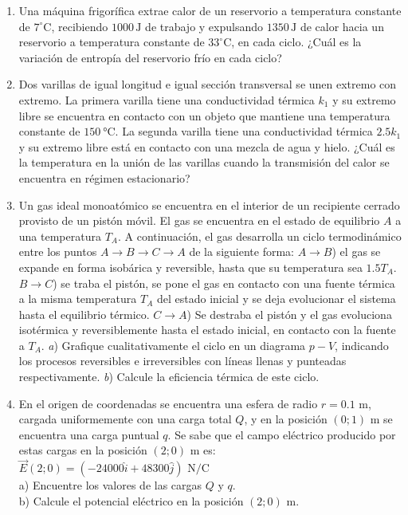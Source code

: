 \documentclass[a4paper,11pt,dvipsnames, twocolumn]{article}
\begin{document}
\begin{enumerate}[wide, labelwidth=2pt, labelindent=0pt]
  
  \item Una máquina frigorífica extrae calor de un reservorio a temperatura constante de $7^\circ\text{C}$, recibiendo $1000\,\text{J}$ de trabajo y expulsando $1350\,\text{J}$ de calor hacia un reservorio a temperatura constante de $33^\circ\text{C}$, en cada ciclo. ¿Cuál es la variación de entropía del reservorio frío en cada ciclo?
  
  
  \item Dos varillas de igual longitud e igual sección transversal se unen extremo con extremo. La primera varilla tiene una conductividad térmica $k_1$ y su extremo libre se encuentra en contacto con un objeto que mantiene una temperatura constante de $\SI{150}{\celsius}$. La segunda varilla tiene una conductividad térmica $2.5k_1$ y su extremo libre está en contacto con una mezcla de agua y hielo. ¿Cuál es la temperatura en la unión de las varillas cuando la transmisión del calor se encuentra en régimen estacionario?

\item Un gas ideal monoatómico se encuentra en el interior de un recipiente cerrado provisto de un pistón móvil. El gas se encuentra en el estado de equilibrio $A$ a una temperatura $T_A$. A continuación, el gas desarrolla un ciclo termodinámico entre los puntos $A\rightarrow B \rightarrow C \rightarrow A$ de la siguiente forma: $A\rightarrow B$) el gas se expande en forma isobárica y reversible, hasta que su temperatura sea $1.5T_A$. $B\rightarrow C$) se traba el pistón, se pone el gas en contacto con una fuente térmica a la misma temperatura $T_A$ del estado inicial y se deja evolucionar el sistema hasta el equilibrio térmico. $C \rightarrow A$) Se destraba el pistón y el gas evoluciona isotérmica y reversiblemente hasta el estado inicial, en contacto con la fuente a $T_A$. \textit{a}) Grafique cualitativamente el ciclo en un diagrama $p-V$, indicando los procesos reversibles e irreversibles con líneas llenas y punteadas respectivamente. \textit{b}) Calcule la eficiencia térmica de este ciclo. 

\item En el origen de coordenadas se encuentra una esfera de radio $r=0.1\text{ m}$, cargada uniformemente con una carga total $Q$, y en la posición $(0;1)\text{ m}$ se encuentra una carga puntual $q$. Se sabe que el campo eléctrico producido por estas cargas en la posición $(2;0)\text{ m}$ es:\\
$\vec{E}(2;0) = \left ( -24000\hat{i}+48300\hat{j} \right )\text{ N/C}$\\
a) Encuentre los valores de las cargas $Q$ y $q$.\\
b) Calcule el potencial eléctrico en la posición $(2;0)\text{ m}$.

\end{enumerate}
\end{document}
